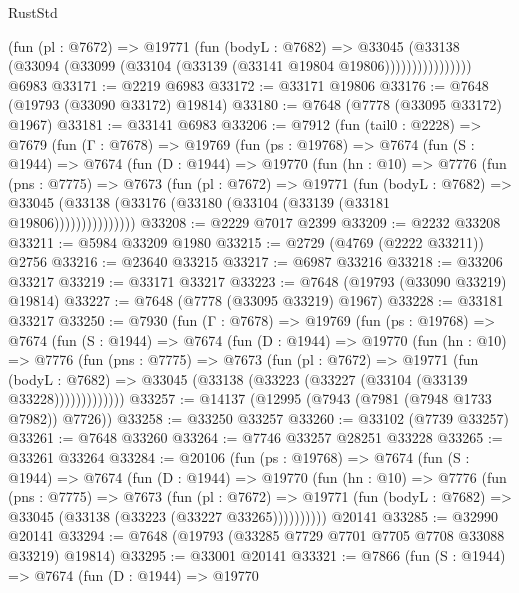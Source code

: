 \begin{lexlean}{RustStd}
\begin{coremodule}
                    (fun (pl : @7672) =>
                    @19771
                      (fun (bodyL : @7682) =>
                      @33045
                        (@33138
                          (@33094 (@33099 (@33104 (@33139 (@33141 @19804 @19806))))))))))))))))
    @6983
@33171 := @2219 @6983
@33172 := @33171 @19806
@33176 := @7648 (@19793 (@33090 @33172) @19814)
@33180 := @7648 (@7778 (@33095 @33172) @1967)
@33181 := @33141 @6983
@33206 := @7912
    (fun (tail0 : @2228) =>
    @7679
      (fun (Γ : @7678) =>
      @19769
        (fun (ps : @19768) =>
        @7674
          (fun (S : @1944) =>
          @7674
            (fun (D : @1944) =>
            @19770
              (fun (hn : @10) =>
              @7776
                (fun (pns : @7775) =>
                @7673
                  (fun (pl : @7672) =>
                  @19771
                    (fun (bodyL : @7682) =>
                    @33045 (@33138 (@33176 (@33180 (@33104 (@33139 (@33181 @19806)))))))))))))))
@33208 := @2229 @7017 @2399
@33209 := @2232 @33208
@33211 := @5984 @33209 @1980
@33215 := @2729 (@4769 (@2222 @33211)) @2756
@33216 := @23640 @33215
@33217 := @6987 @33216
@33218 := @33206 @33217
@33219 := @33171 @33217
@33223 := @7648 (@19793 (@33090 @33219) @19814)
@33227 := @7648 (@7778 (@33095 @33219) @1967)
@33228 := @33181 @33217
@33250 := @7930
    (fun (Γ : @7678) =>
    @19769
      (fun (ps : @19768) =>
      @7674
        (fun (S : @1944) =>
        @7674
          (fun (D : @1944) =>
          @19770
            (fun (hn : @10) =>
            @7776
              (fun (pns : @7775) =>
              @7673
                (fun (pl : @7672) =>
                @19771
                  (fun (bodyL : @7682) =>
                  @33045 (@33138 (@33223 (@33227 (@33104 (@33139 @33228)))))))))))))
@33257 := @14137 (@12995 (@7943 (@7981 (@7948 @1733 @7982)) @7726))
@33258 := @33250 @33257
@33260 := @33102 (@7739 @33257)
@33261 := @7648 @33260
@33264 := @7746 @33257 @28251 @33228
@33265 := @33261 @33264
@33284 := @20106
    (fun (ps : @19768) =>
    @7674
      (fun (S : @1944) =>
      @7674
        (fun (D : @1944) =>
        @19770
          (fun (hn : @10) =>
          @7776
            (fun (pns : @7775) =>
            @7673
              (fun (pl : @7672) =>
              @19771 (fun (bodyL : @7682) => @33045 (@33138 (@33223 (@33227 @33265))))))))))
    @20141
@33285 := @32990 @20141
@33294 := @7648 (@19793 (@33285 @7729 @7701 @7705 @7708 @33088 @33219) @19814)
@33295 := @33001 @20141
@33321 := @7866
    (fun (S : @1944) =>
    @7674
      (fun (D : @1944) =>
      @19770

\end{coremodule}
\end{lexlean}
